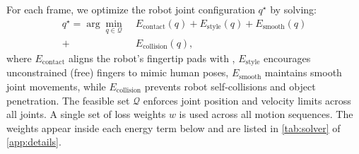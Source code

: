  For each frame, we optimize the robot joint configuration $q^\star$ by solving:
\begin{align}
\label{eq:objective}
q^{\star} = \arg\min_{q \in \mathcal{Q}} \; &E_{\mathrm{contact}}(q) + E_{\mathrm{style}}(q) + E_{\mathrm{smooth}}(q)\nonumber\\ + &E_{\mathrm{collision}}(q),
\end{align}
where $E_{\mathrm{contact}}$ aligns the robot's fingertip pads with \fca, $E_{\mathrm{style}}$ encourages unconstrained (free) fingers to mimic human poses, $E_{\mathrm{smooth}}$ maintains smooth joint movements, while $E_{\mathrm{collision}}$ prevents robot self-collisions and object penetration. The feasible set $\mathcal{Q}$ enforces joint position and velocity limits across all joints. A single set of loss weights $w$ is used across all motion sequences. The weights appear inside each energy term below and are listed in \cref{tab:solver} of \cref{app:details}.

